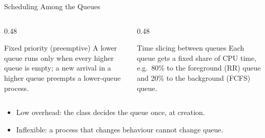 \documentclass[aspectratio=169]{beamer}
\begin{document}
\begin{frame}{Scheduling Among the Queues}
  \begin{columns}[T]
    \begin{column}{0.48\textwidth}
      \begin{block}{Fixed priority (preemptive)}
        A lower queue runs only when every higher queue is empty; a new
        arrival in a higher queue preempts a lower-queue process.
      \end{block}
    \end{column}
    \begin{column}{0.48\textwidth}
      \begin{block}{Time slicing between queues}
        Each queue gets a fixed share of CPU time, e.g.\ 80\% to the
        foreground (RR) queue and 20\% to the background (FCFS) queue.
      \end{block}
    \end{column}
  \end{columns}
  \vspace{0.3cm}
  \begin{itemize}
    \item Low overhead: the class decides the queue once, at creation.
    \item Inflexible: a process that changes behaviour cannot change queue.
  \end{itemize}
\end{frame}
\end{document}

